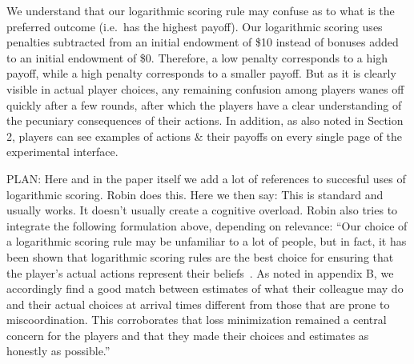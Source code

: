 \documentclass[a4paper]{article}
\newenvironment{response}{\smallskip \noindent \color{blue}}{\color{black}\smallskip}
\begin{document}
\begin{enumerate}
  \begin{response}
  We understand that our logarithmic scoring rule may confuse as to what is the preferred outcome (i.e.\ has the highest payoff). Our logarithmic scoring uses penalties subtracted from an initial endowment of \$10 instead of bonuses added to an initial endowment of \$0. Therefore, a low penalty corresponds to a high payoff, while a high penalty corresponds to a smaller payoff. But as it is clearly visible in actual player choices, any remaining confusion among players wanes off quickly after a few rounds, after which the players have a clear understanding of the pecuniary consequences of their actions. In addition, as also noted in Section 2, players can see examples of actions \& their payoffs on every single page of the experimental interface.  
  
PLAN: Here and in the paper itself we add a lot of references to succesful uses of logarithmic scoring. Robin does this. Here we then say: This is standard and usually works. It doesn't usually create a cognitive overload. Robin also tries to integrate the following formulation above, depending on relevance: ``Our choice of a logarithmic scoring rule may be unfamiliar to a lot of people, but in fact, it has been shown that logarithmic scoring rules are the best choice for ensuring that the player's actual actions represent their beliefs~\cite{seidenfeld1985calibration, palfrey2009eliciting}. As noted in appendix B, we accordingly find a good match between estimates of what their colleague may do and their actual choices at arrival times different from those that are prone to miscoordination. This corroborates that loss minimization remained a central concern for the players and that they made their choices and estimates as honestly as possible.''
\end{response}



\end{enumerate}
\end{document}
